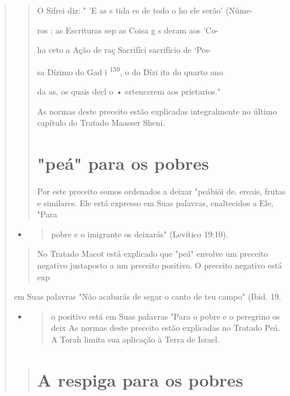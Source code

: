 \begin{quote}
\begin{quote}
O Sifrei diz: " 'E as s tida es de todo o ho ele serão' (Núme-

ros : as Escrituras sep as Coisa g s deram aos 'Co-

ha ceto a Ação de raç Sacrifíci sacrifício de `Pes-

sa Dízimo do Gad i \textsuperscript{159}, o do Dízi ita do quarto ano

da as, os quais decl o • ertencerem aos prietarios."

As normas deste preceito estão explicadas integralmente no último
capítulo do Tratado Maasser Sheni.

\section{"peá" para os pobres}

Por este preceito somos ordenados a deixar "peábiói
de. ereais, fru­tas e similares. Ele está expresso em
Suas palavras, enaltecidos a Ele, "Para
\end{quote}

\begin{itemize}
\item
 \begin{quote}
 pobre e o imigrante os deixarás" (Levítico 19:10).
 \end{quote}
\end{itemize}

\begin{quote}
No Tratado Macot está explicado que "peá" envolve um preceito negativo
justaposto a um preceito positivo. O preceito negativo está exp
\end{quote}

em Suas palavras "Não acabarás de segar o canto de teu campo" (Ibid. 19.

\begin{itemize}
\item
 \begin{quote}
 o positivo está em Suas palavras "Para o pobre e o peregrino os deix
 As normas deste preceito estão explicadas no Tratado Peá. A Torah
 limita sua aplicação à Terra de Israel.
 \end{quote}
\end{itemize}

\begin{quote}
\section{A respiga para os pobres}


\end{quote}
\end{quote}
